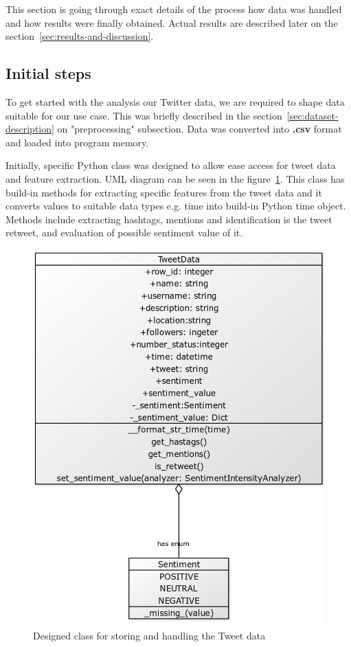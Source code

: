 This section is going through exact details of the process how data was handled and how results were finally obtained.
Actual results are described later on the section~\ref{sec:results-and-discussion}.

\subsection{Initial steps}

To get started with the analysis our Twitter data, we are required to shape data suitable for our use case.
This was briefly described in the section~\ref{sec:dataset-description} on "preprocessing" subsection.
Data was converted into \textbf{.csv} format and loaded into program memory.

Initially, specific Python class was designed to allow ease access for tweet data and feature extraction.
UML diagram can be seen in the figure~\ref{fig:tweetdata_design}.
This class has build-in methods for extracting specific features from the tweet data and it converts values to suitable data types e.g. time into build-in Python time object.
Methods include extracting hashtags, mentions and identification is the tweet retweet, and evaluation of possible sentiment value of it.

\begin{figure}
    \includegraphics[scale=0.3]{figures/uml_tweetdata}
    \caption{Designed class for storing and handling the Tweet data}
    \label{fig:tweetdata_design}
\end{figure}

